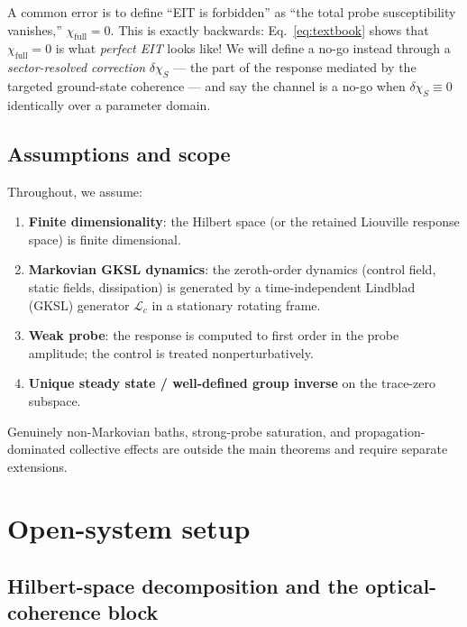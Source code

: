\documentclass[11pt,a4paper]{article}
\theoremstyle{remark}
\newcommand{\dchi}{\delta\chi_{S}}
\newcommand{\chifull}{\chi_{\mathrm{full}}}
\begin{document}
\begin{warningbox}
A common error is to define ``EIT is forbidden'' as ``the total probe
susceptibility vanishes,'' $\chifull=0$. This is exactly backwards:
Eq.~\eqref{eq:textbook} shows that $\chifull=0$ is what \emph{perfect EIT}
looks like! We will define a no-go instead through a \emph{sector-resolved
correction} $\dchi$ --- the part of the response mediated by the targeted
ground-state coherence --- and say the channel is a no-go when
$\dchi\equiv0$ identically over a parameter domain.
\end{warningbox}

\subsection{Assumptions and scope}

Throughout, we assume:
\begin{enumerate}[label=(A\arabic*)]
\item \textbf{Finite dimensionality}: the Hilbert space (or the retained
      Liouville response space) is finite dimensional.
\item \textbf{Markovian GKSL dynamics}: the zeroth-order dynamics (control
      field, static fields, dissipation) is generated by a time-independent
      Lindblad (GKSL) generator $\mathcal{L}_c$ in a stationary rotating frame.
\item \textbf{Weak probe}: the response is computed to first order in the
      probe amplitude; the control is treated nonperturbatively.
\item \textbf{Unique steady state / well-defined group inverse} on the
      trace-zero subspace.
\end{enumerate}
Genuinely non-Markovian baths, strong-probe saturation, and
propagation-dominated collective effects are outside the main theorems and
require separate extensions.

\section{Open-system setup}

\subsection{Hilbert-space decomposition and the optical-coherence block}
\end{document}
